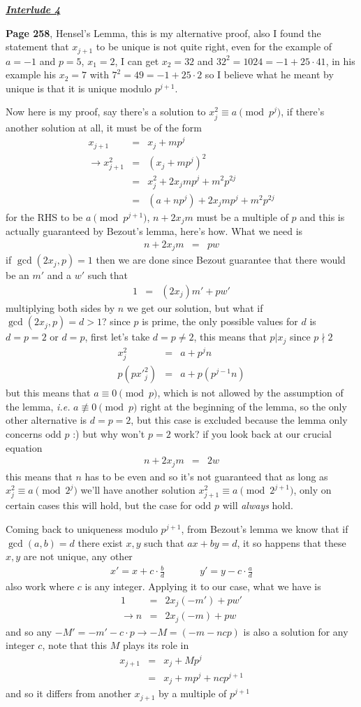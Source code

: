 \documentclass[aps,preprint,preprintnumbers,nofootinbib,showpacs,prd]{revtex4-1}
\newcommand{\ie}{{\it i.e.} }
\newcommand{\nbea}{\begin{eqnarray*}}
\newcommand{\neea}{\end{eqnarray*}}
\begin{document}
\bigskip
\underline{\textit{\textbf{Interlude 4}}}
\bigskip

{\bf Page 258}, Hensel's Lemma, this is my alternative proof, also I found the statement that $x_{j+1}$ to be unique is not quite right, even for the example of $a=-1$ and $p=5$, $x_1=2$, I can get $x_2 = 32$ and $32^2 = 1024 = -1 + 25\cdot 41$, in his example his $x_2 = 7$ with $7^2 = 49 = -1 + 25\cdot 2$ so I believe what he meant by unique is that it is unique modulo $p^{j+1}$.

Now here is my proof, say there's a solution to $x_j^2 \equiv a \pmod{p^j}$, if there's another solution at all, it must be of the form
%
\nbea
x_{j+1} & = & x_j + mp^j \\
\to x_{j+1}^2 & = & (x_j + mp^j)^2 \\
& = & x^2_j + 2x_jmp^j + m^2p^{2j} \\
& = & (a + np^j) + 2x_jmp^j + m^2p^{2j}
\neea
%
for the RHS to be $a \pmod{p^{j+1}}$, $n+ 2x_jm$ must be a multiple of $p$ and this is actually guaranteed by Bezout's lemma, here's how. What we need is
%
\nbea
n+ 2x_jm & = & pw
\neea
%
if $\gcd(2x_j,p)=1$ then we are done since Bezout guarantee that there would be an $m'$ and a $w'$ such that
%
\nbea
1 & = & (2x_j)m' + pw'
\neea
%
multiplying both sides by $n$ we get our solution, but what if $\gcd(2x_j,p) = d > 1$? since $p$ is prime, the only possible values for $d$ is $d=p=2$ or $d = p$, first let's take $d = p \neq 2$, this means that $p|x_j$ since $p\nmid 2$
%
\nbea
x_j^2 & = & a +p^jn \\
p(p{x'}_j^2) & = & a +p(p^{j-1}n)
\neea
%
but this means that $a \equiv 0 \pmod{p}$, which is not allowed by the assumption of the lemma, \ie $a \not\equiv 0 \pmod{p}$ right at the beginning of the lemma, so the only other alternative is $d = p = 2$, but this case is excluded because the lemma only concerns odd $p$ :) but why won't $p=2$ work? if you look back at our crucial equation
%
\nbea
n+ 2x_jm & = & 2w
\neea
%
this means that $n$ has to be even and so it's not guaranteed that as long as $x_j^2 \equiv a \pmod{2^j}$ we'll have another solution $x_{j+1}^2 \equiv a \pmod{2^{j+1}}$, only on certain cases this will hold, but the case for odd $p$ will {\it always} hold.

Coming back to uniqueness modulo $p^{j+1}$, from Bezout's lemma we know that if $\gcd(a,b)=d$ there exist $x,y$ such that $ax+by=d$, it so happens that these $x,y$ are not unique, any other
%
\nbea
x' = x + c\cdot\frac{b}{d} & ~~~~~~~~~ & y' = y - c\cdot\frac{a}{d}
\neea
%
also work where $c$ is any integer. Applying it to our case, what we have is
%
\nbea
1 & = & 2x_j(-m') + pw' \\
\to n & = & 2x_j(-m) + pw
\neea
%
and so any $-M' = -m' - c\cdot p \to -M = (-m - ncp)$ is also a solution for any integer $c$, note that this $M$ plays its role in
%
\nbea
x_{j+1} & = & x_j + Mp^j \\
& = & x_j + mp^j + ncp^{j+1}
\neea
%
and so it differs from another $x_{j+1}$ by a multiple of $p^{j+1}$
\end{document}
